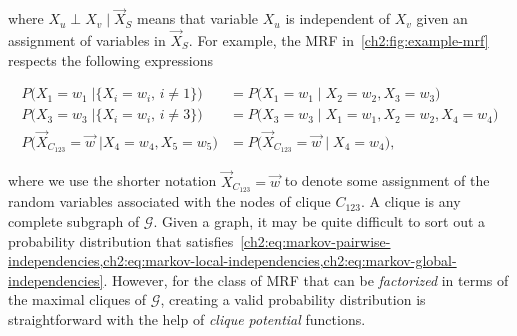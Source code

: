 where $X_u  \perp  X_v \;|\; \vec{X}_S$ means that variable $X_u$ is independent of $X_v$ given an assignment of variables in $\vec{X}_S$.  For example, the MRF in~\cref{ch2:fig:example-mrf} respects the following expressions 

\begin{align*}
		P\Big(X_1=w_1 \; | \big\{X_i=w_i, \, i \neq 1 \big\} \Big) &= P\Big(X_1=w_1 \; | \; X_2=w_2,X_3=w_3 \Big) \\
		P\Big(X_3=w_3 \; | \big\{X_i=w_i, \, i \neq 3 \big\} \Big) &= P\Big(X_3=w_3 \; | \; X_1=w_1,X_2=w_2, X_4=w_4 \Big) \\
		P\Big(\vec{X}_{C_{123}} = \vec{w} \; | X_4=w_4, X_5=w_5  \Big) &= P\Big(\vec{X}_{C_{123}} = \vec{w} \; | \; X_4=w_4 \Big),		
\end{align*}

where we use the shorter notation $\vec{X}_{C_{123}} = \vec{w} $ to denote some assignment of the random variables associated with the nodes of clique $C_{123}$. A clique is any complete subgraph of $\mathcal{G}$. Given a graph, it may be quite difficult to sort out a probability distribution that satisfies~\cref{ch2:eq:markov-pairwise-independencies,ch2:eq:markov-local-independencies,ch2:eq:markov-global-independencies}. However, for the class of MRF that can be \emph{factorized} in terms of the maximal cliques of $\mathcal{G}$, creating a valid probability distribution is straightforward with the help of \emph{clique potential} functions.

